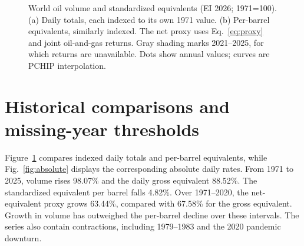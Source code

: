 \documentclass[reprint,aps,pra,longbibliography,floatfix]{revtex4-2}
\begin{document}
\begin{figure}[!t]
{

}
\par\vspace{18pt}\caption{World oil volume and standardized equivalents (EI 2026; 1971=100). (a) Daily totals, each indexed to its own 1971 value. (b) Per-barrel equivalents, similarly indexed. The net proxy uses Eq.~\eqref{eq:proxy} and joint oil-and-gas returns. Gray shading marks 2021--2025, for which returns are unavailable. Dots show annual values; curves are PCHIP interpolation.}\label{fig:relative}
\end{figure}

\section{Historical comparisons and missing-year thresholds}
Figure~\ref{fig:relative} compares indexed daily totals and per-barrel equivalents, while Fig.~\ref{fig:absolute} displays the corresponding absolute daily rates. From 1971 to 2025, volume rises 98.07\% and the daily gross equivalent 88.52\%. The standardized equivalent per barrel falls 4.82\%. Over 1971--2020, the net-equivalent proxy grows 63.44\%, compared with 67.58\% for the gross equivalent. Growth in volume has outweighed the per-barrel decline over these intervals. The series also contain contractions, including 1979--1983 and the 2020 pandemic downturn.
\end{document}
